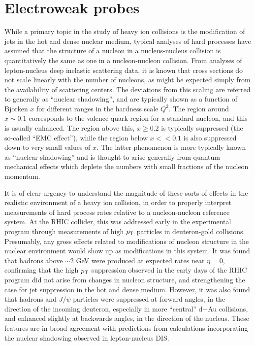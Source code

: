 \section{Electroweak probes}
\label{sect:pas:ew}

While a primary topic in the study of heavy ion collisions is the modification
of jets in the hot and dense nuclear medium, typical analyses of
hard processes have assumed that the
structure of a nucleon in a nucleus-nucleus collision is quantitatively the
same as one in a nucleon-nucleon collision.
From analyses of lepton-nucleus deep inelastic scattering data,
it is known that cross sections do not scale linearly with the number of nucleons,
as might be expected simply from the availability of scattering centers.
The deviations from this scaling are referred to generally as ``nuclear shadowing'',
and are typically shown as a function of Bjorken $x$ for different ranges in the
hardness scale $Q^2$.
The region around $x \sim 0.1$ corresponds to the valence quark region for a standard
nucleon, and this is usually enhanced.  The region above this, $x \geq 0.2$ is typically
suppressed (the so-called ``EMC effect''), while the region below $x << 0.1$ is also
suppressed down to very small values of $x$.  The latter phenomenon is more
typically known as ``nuclear shadowing'' and is thought to arise generally from 
quantum mechanical effects which deplete the numbers with small fractions of the
nucleon momentum.
  
It is of clear urgency to understand the magnitude of these sorts of effects in 
the realistic environment of a heavy ion collision, in order to properly interpret
measurements of hard process rates relative to a nucleon-nucleon reference system.
At the RHIC collider, this was addressed early in the experimental program 
through measurements of high $\mbox{$p_{\mathrm{T}}$}$ particles in deuteron-gold collisions.
Presumably, any gross effects related to modifications of nucleon structure in the
nuclear environment would show up as modifications in this system.  It was found that
hadrons above $\sim 2$ GeV were produced at expected rates near $\eta =0$, confirming that
the high $\mbox{$p_{\mathrm{T}}$}$ suppression observed in the early days of the RHIC program did not
arise from changes in nucleon structure, and strengthening the case for jet suppression
in the hot and dense medium.
However, it was also found that hadrons and $J/\psi$ particles were suppressed at 
forward angles, in the direction of the incoming deuteron, especially in more ``central'' d+Au collisions, and enhanced slightly at backwards angles, in the direction of the
nucleus.  These features are in broad agreement with predictions from calculations
incorporating the nuclear shadowing observed in lepton-nucleus DIS.

